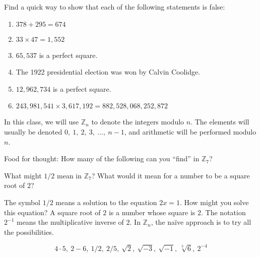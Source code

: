 \documentclass[space,nooutcomes,handout]{ximera}
\begin{document}
\begin{problem}
Find a quick way to show that each of the following statements is false: 
\begin{enumerate}
\item $378 + 295 = 674$
\item $33 \times 47 = 1,552$
\item $65,537$ is a perfect square.
\item The 1922 presidential election was won by Calvin Coolidge.
\item $12,962,734$ is a perfect square.
\item $243,981,541 \times 3,617,192 = 882,528,068,252,872$
\end{enumerate}
\begin{freeResponse}
\end{freeResponse}
\end{problem}

In this class, we will use $\mathbb{Z}_n$ to denote the integers modulo $n$.  The elements will usually be denoted $0,\ 1,\ 2,\ 3,\ \dots,\ n - 1$, and arithmetic will be performed modulo $n$.  

\begin{problem}
Food for thought:  How many of the following can you ``find'' in $\mathbb{Z}_7$?  
\begin{hint}
What might $1/2$ mean in $\mathbb{Z}_7$?  What would it mean for a number to be a square root of $2$?  
\end{hint}
\begin{hint}
The symbol $1/2$ means a solution to the equation $2x = 1$.  How might you solve this equation?  A square root of $2$ is a number whose square is $2$.  The notation $2^{-1}$ means the multiplicative inverse of $2$.  In $\mathbb{Z}_n$, the na\"ive approach is to try all the possibilities.
\end{hint}
\[
4\cdot 5,\ 2 - 6,\ 1/2,\ 2/5,\ \sqrt{2},\ \sqrt{-3},\ \sqrt{-1},\ \sqrt[3]{6},\ 2^{-4}
\]
\begin{freeResponse}
\end{freeResponse}
\end{problem}
\end{document}
